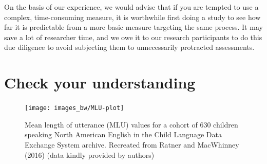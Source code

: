 \documentclass{krantz}
\begin{document}
On the basis of our experience, we would advise that if you are tempted to use a complex, time-consuming measure, it is worthwhile first doing a study to see how far it is predictable from a more basic measure targeting the same process. It may save a lot of researcher time, and we owe it to our research participants to do this due diligence to avoid subjecting them to unnecessarily protracted assessments.

\hypertarget{check-your-understanding-2}{%
\section{Check your understanding}\label{check-your-understanding-2}}

\begin{figure}
\texttt{[image: images\_bw/MLU-plot]} \caption{Mean length of utterance (MLU) values for a cohort of 630 children speaking North American English in the Child Language Data Exchange System archive. Recreated from Ratner and MacWhinney (2016) (data kindly provided by authors)}\label{fig:MLU-plot}
\end{figure}
\end{document}
